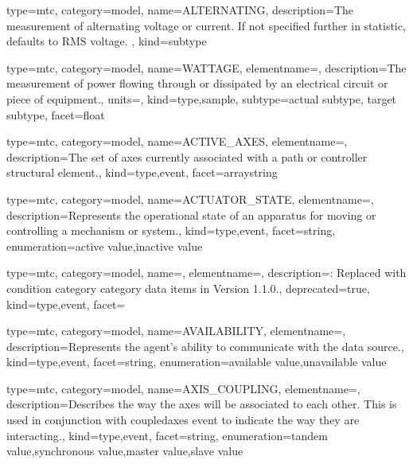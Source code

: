 {
  type=mtc,
  category=model,
  name={ALTERNATING},
  description={The measurement of alternating voltage or current.   If not specified further in statistic, defaults to RMS voltage. },
  kind={subtype}
}


{
  type=mtc,
  category=model,
  name={WATTAGE},
  elementname=,
  description={The measurement of power flowing through or dissipated by an electrical circuit or piece of equipment.},
  units=,
  kind={type,sample},
  subtype={\gls{actual subtype}, \gls{target subtype}},
  facet={\gls{float}}
}


{
  type=mtc,
  category=model,
  name={ACTIVE\_AXES},
  elementname=,
  description={The set of axes currently associated with a \gls{path} or \gls{controller} \gls{structural element}.},
  kind={type,event},
  facet={\gls{arraystring}}
}


{
  type=mtc,
  category=model,
  name={ACTUATOR\_STATE},
  elementname=,
  description={Represents the operational state of an apparatus for moving or controlling a mechanism or system.},
  kind={type,event},
  facet={\gls{string}},
  enumeration={\gls{active value},\gls{inactive value}}
}


{
  type=mtc,
  category=model,
  name=,
  elementname=,
  description={\DEPRECATED: Replaced with \gls{condition category} category data items in Version 1.1.0.},
  deprecated={true},
  kind={type,event},
  facet={}
}


{
  type=mtc,
  category=model,
  name={AVAILABILITY},
  elementname=,
  description={Represents the \gls{agent}'s ability to communicate with the data source.},
  kind={type,event},
  facet={\gls{string}},
  enumeration={\gls{available value},\gls{unavailable value}}
}


{
  type=mtc,
  category=model,
  name={AXIS\_COUPLING},
  elementname=,
  description={Describes the way the axes will be associated to each other. 
  \newline This is used in conjunction with \gls{coupledaxes event} to indicate the way they are interacting.},
  kind={type,event},
  facet={\gls{string}},
  enumeration={\gls{tandem value},\gls{synchronous value},\gls{master value},\gls{slave value}}
}


